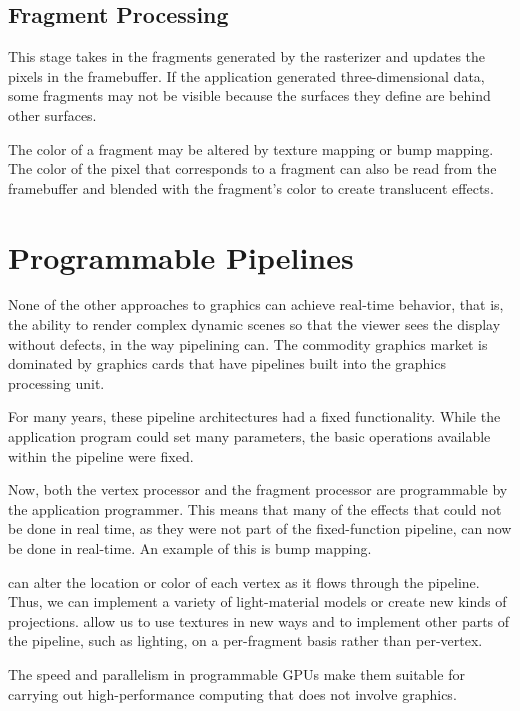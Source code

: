 \documentclass[\main/notes.tex]{subfiles}
\begin{document}
			\subsection{Fragment Processing}
				This stage takes in the fragments generated by the rasterizer
				and updates the pixels in the framebuffer.
				If the application generated three-dimensional data,
				some fragments may not be visible
				because the surfaces they define are behind other surfaces.

				The color of a fragment may be altered by texture mapping or bump mapping.
				The color of the pixel that corresponds to a fragment
				can also be read from the framebuffer
				and blended with the fragment's color
				to create translucent effects.

		\pagebreak

		\section{Programmable Pipelines}
			None of the other approaches to graphics
			can achieve real-time behavior,
			that is, the ability to render complex dynamic scenes
			so that the viewer sees the display without defects,
			in the way pipelining can.
			The commodity graphics market is dominated by graphics cards
			that have pipelines built into the graphics processing unit.

			For many years, these pipeline architectures had a fixed functionality.
			While the application program could set many parameters,
			the basic operations available within the pipeline were fixed.

			Now, both the vertex processor and the fragment processor are
			programmable by the application programmer.
			This means that many of the effects that could not be done in real time,
			as they were not part of the fixed-function pipeline,
			can now be done in real-time.
			An example of this is bump mapping.

			 can alter the location or color of each vertex
			as it flows through the pipeline.
			Thus, we can implement a variety of light-material models
			or create new kinds of projections.
			 allow us to use textures in new ways
			and to implement other parts of the pipeline,
			such as lighting,
			on a per-fragment basis rather than per-vertex.

			The speed and parallelism in programmable GPUs
			make them suitable for carrying out high-performance computing
			that does not involve graphics.
\end{document}
